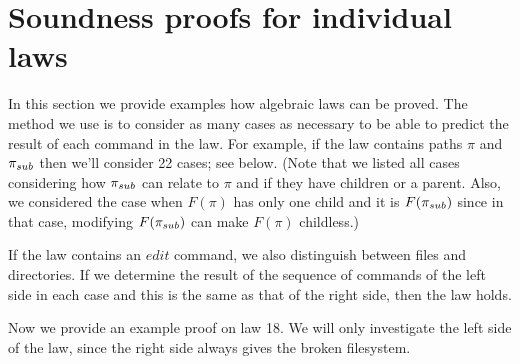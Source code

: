 \section{Soundness proofs for individual laws}
\label{app:soundness}

In this section we provide examples how algebraic laws can be proved.
The method we use is to consider as many cases as necessary to be able to
predict the result of each command in the law. For example, if the law
contains paths \(\pi\) and \(\pi_{sub}\) then we'll consider 
22 cases; see below.
(Note that we listed all cases considering how \(\pi_{sub}\) can relate to
\(\pi\) and if they have children or a parent. Also, we considered the
case when \(F(\pi)\) has
only one child and it is \(F(\pi_{sub})\) since in that case, modifying
\(F(\pi_{sub})\) can make \(F(\pi)\) childless.)

If the law contains an \(edit\) command, we also distinguish
between files and directories. If we determine the result of the sequence
of commands of the left side in each case and this is the same as that of
the right side, then the law holds.

Now we provide an example proof on law 18. We will only investigate the
left side of the law, since the right side always gives the broken
filesystem. 

\begin{forrsi*}
\end{forrsi*}

